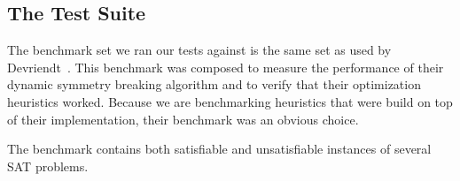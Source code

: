 \subsection{The Test Suite}
\label{ssec:benchmark}
	The benchmark set we ran our tests against is the same set as used by Devriendt~\cite{devriendt2012symmetry}.
	This benchmark was composed to measure the performance of their dynamic symmetry
	breaking algorithm and to verify that their optimization heuristics worked.
	Because we are benchmarking heuristics that were build on top of their implementation, their
	benchmark was an obvious choice.

	The benchmark contains both satisfiable and unsatisfiable instances of several SAT problems.
